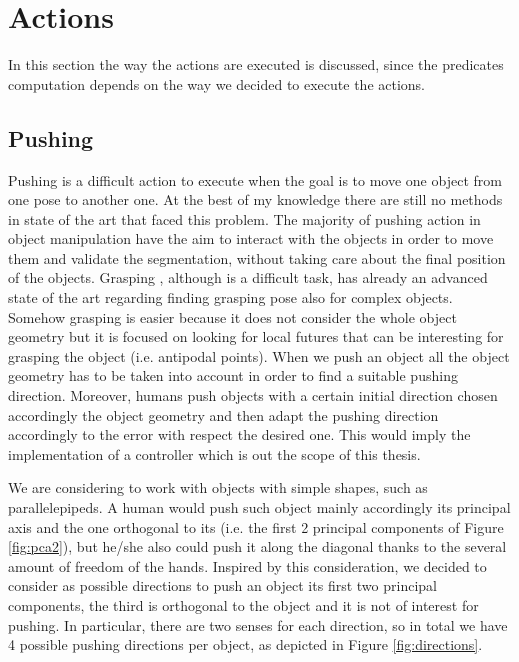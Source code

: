 


\section{Actions}
In this section the way the actions are executed is discussed, since the predicates computation depends on the way we decided to execute the actions.  


\subsection{Pushing}

Pushing is a difficult action to execute when the goal is to move one object from one pose to another one. At the best of my knowledge  there are still no methods in state of the art that faced this problem. The majority of pushing action in object manipulation have the aim to interact with the objects in order to move them and validate the segmentation, without taking care about the final position of the objects. Grasping , although is a difficult task, has already an advanced state of the art regarding finding grasping pose also for complex objects. Somehow grasping is easier because it does not consider the whole object geometry but it is focused on looking for local futures that can be interesting for grasping the object (i.e. antipodal points). When we push an object all the object geometry has to be taken into account in order to find a suitable pushing direction. Moreover, humans push objects with a certain initial direction chosen accordingly the object geometry and then adapt the pushing direction accordingly to the error with respect the desired one. This would imply the implementation of a controller which is out the scope of this thesis. 

We are considering to work with objects with simple shapes, such as parallelepipeds. 
A human would push such object mainly accordingly its principal axis and the one orthogonal to its (i.e. the first 2 principal components of Figure \ref{fig:pca2}), but he/she also could push it along the diagonal thanks to the several amount of freedom of the hands. 
Inspired by this consideration, we decided to consider as possible directions to push an object  its first two principal components, the third is orthogonal to the object and it is not of interest for pushing. In particular, there are two senses for each direction, so in total we have 4 possible pushing directions per object, as depicted in Figure \ref{fig:directions}.

